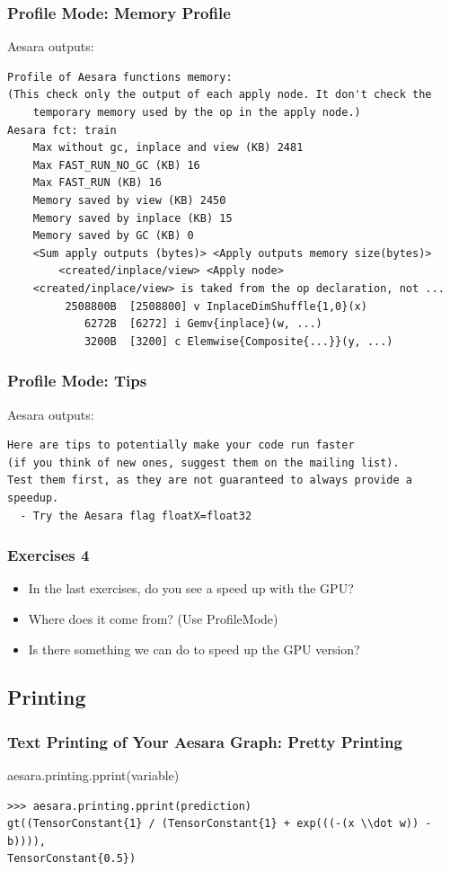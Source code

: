 \documentclass[a4paper,9pt]{beamer}
\begin{document}
\begin{frame}[fragile]
\frametitle{Profile Mode: Memory Profile}
Aesara outputs:
\vfill
\begin{Verbatim}
Profile of Aesara functions memory:
(This check only the output of each apply node. It don't check the
    temporary memory used by the op in the apply node.)
Aesara fct: train
    Max without gc, inplace and view (KB) 2481
    Max FAST_RUN_NO_GC (KB) 16
    Max FAST_RUN (KB) 16
    Memory saved by view (KB) 2450
    Memory saved by inplace (KB) 15
    Memory saved by GC (KB) 0
    <Sum apply outputs (bytes)> <Apply outputs memory size(bytes)>
        <created/inplace/view> <Apply node>
    <created/inplace/view> is taked from the op declaration, not ...
         2508800B  [2508800] v InplaceDimShuffle{1,0}(x)
            6272B  [6272] i Gemv{inplace}(w, ...)
            3200B  [3200] c Elemwise{Composite{...}}(y, ...)
\end{Verbatim}
\end{frame}

\begin{frame}[fragile]
\frametitle{Profile Mode: Tips}
Aesara outputs:
\vfill
\begin{Verbatim}
Here are tips to potentially make your code run faster
(if you think of new ones, suggest them on the mailing list).
Test them first, as they are not guaranteed to always provide a speedup.
  - Try the Aesara flag floatX=float32
\end{Verbatim}
\end{frame}

\begin{frame}
\frametitle{Exercises 4}

\begin{itemize}
\item In the last exercises, do you see a speed up with the GPU?
\item Where does it come from? (Use ProfileMode)
\item Is there something we can do to speed up the GPU version?
\end{itemize}
\end{frame}


\subsection{Printing}
\begin{frame}[fragile]
\frametitle{Text Printing of Your Aesara Graph: Pretty Printing}
aesara.printing.pprint(variable)
\vfill
\begin{Verbatim}
>>> aesara.printing.pprint(prediction)
gt((TensorConstant{1} / (TensorConstant{1} + exp(((-(x \\dot w)) - b)))),
TensorConstant{0.5})
\end{Verbatim}
\end{frame}
\end{document}
